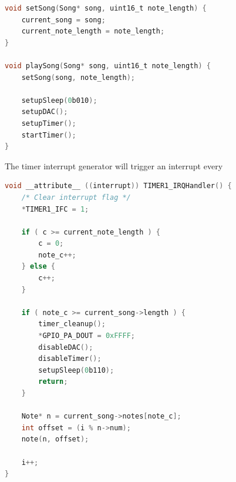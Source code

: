 \begin{minipage}{\linewidth}
\begin{lstlisting}[language=C, label=playing_music, caption=Excerpts from music.c]
void setSong(Song* song, uint16_t note_length) {
    current_song = song;
    current_note_length = note_length;
}

void playSong(Song* song, uint16_t note_length) {
    setSong(song, note_length);

    setupSleep(0b010);
    setupDAC();
    setupTimer();
    startTimer();
}
\end{lstlisting}
\end{minipage}



The timer interrupt generator will trigger an interrupt every
\begin{minipage}{\linewidth}
\begin{lstlisting}[language=C, label=interrupt_handlers, caption=Timer interrupt handler from interrupt\_handlers.c]
void __attribute__ ((interrupt)) TIMER1_IRQHandler() {  
    /* Clear interrupt flag */
    *TIMER1_IFC = 1;

    if ( c >= current_note_length ) {
        c = 0;
        note_c++;
    } else {
        c++;
    }

    if ( note_c >= current_song->length ) {
        timer_cleanup();
        *GPIO_PA_DOUT = 0xFFFF;
        disableDAC();
        disableTimer();
        setupSleep(0b110);
        return;
    }

    Note* n = current_song->notes[note_c];
    int offset = (i % n->num);
    note(n, offset);

    i++;
}
\end{lstlisting}
\end{minipage}
